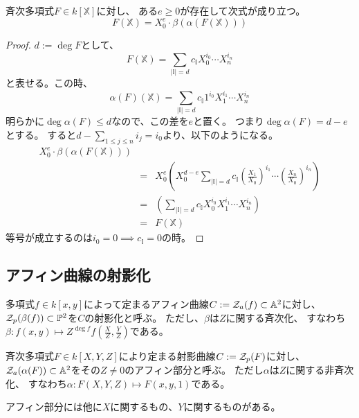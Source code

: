 \documentclass[a4paper]{jsarticle}
\begin{document}
    \begin{Lemma}
        斉次多項式$F \in k[\mathbb{X}]$に対し、
        ある$e \geq 0$が存在して次式が成り立つ。
        \[ F(\mathbb{X}) = X_0^e \cdot \beta(\alpha(F(\mathbb{X})))\]
    \end{Lemma}
    \begin{proof}
        $d:=\deg F$として、
        \[ F(\mathbb{X}) = \sum_{|\mathbb{I}|=d}{c_{\mathbb{I}} X_0^{i_0} \cdots X_n^{i_n}}\]
        と表せる。この時、
        \[ \alpha(F)(\mathbb{X}) = \sum_{|\mathbb{I}|=d}{c_{\mathbb{I}} 1^{i_0} X_1^{i_1} \cdots X_n^{i_n}}\]
        明らかに$\deg \alpha(F) \leq d$なので、この差を$e$と置く。
        つまり$\deg \alpha(F)=d-e$とする。
        すると$d-\sum_{1 \leq j \leq n}{i_j}=i_0$より、以下のようになる。
        \begin{eqnarray*}
            X_0^e \cdot \beta(\alpha(F(\mathbb{X}))) \\
            &=& X_0^e
            \left(
                X_0^{d-e}
                \sum_{|\mathbb{I}|=d}{c_{\mathbb{I}} \left(\frac{X_1}{X_0}\right)^{i_1} \cdots \left(\frac{X_n}{X_0}\right)^{i_n}}
            \right) \\
            &=&
            \left(
                \sum_{|\mathbb{I}|=d}{c_{\mathbb{I}} X_0^{i_0} X_1^{i_1} \cdots X_n^{i_n}}
            \right) \\
            &=& F(\mathbb{X})
        \end{eqnarray*}
        等号が成立するのは$i_0=0 \implies c_{\mathbb{I}}=0$の時。
        
    \end{proof}

    \subsection{アフィン曲線の射影化}
    \begin{Def}
        多項式$f \in k[x,y]$によって定まるアフィン曲線$C:=\mathcal{Z}_a(f) \subset \mathbb{A}^2$に対し、
        $\mathcal{Z}_p(\beta(f)) \subset \mathbb{P}^2$を$C$の射影化と呼ぶ。
        ただし、$\beta$は$Z$に関する斉次化、
        すなわち$\beta : f(x, y) \mapsto Z^{\deg f}f \left( \frac{X}{Z},\frac{Y}{Z}\right)$である。
    \end{Def}

    \begin{Def}
        斉次多項式$F \in k[X, Y, Z]$により定まる射影曲線$C:=\mathcal{Z}_p(F)$に対し、
        $\mathcal{Z}_a(\alpha(F)) \subset \mathbb{A}^2$をその$Z \neq 0$のアフィン部分と呼ぶ。
        ただし$\alpha$は$Z$に関する非斉次化、
        すなわち$\alpha : F(X, Y, Z) \mapsto F(x, y, 1)$である。
    \end{Def}
    アフィン部分には他に$X$に関するもの、$Y$に関するものがある。
\end{document}

